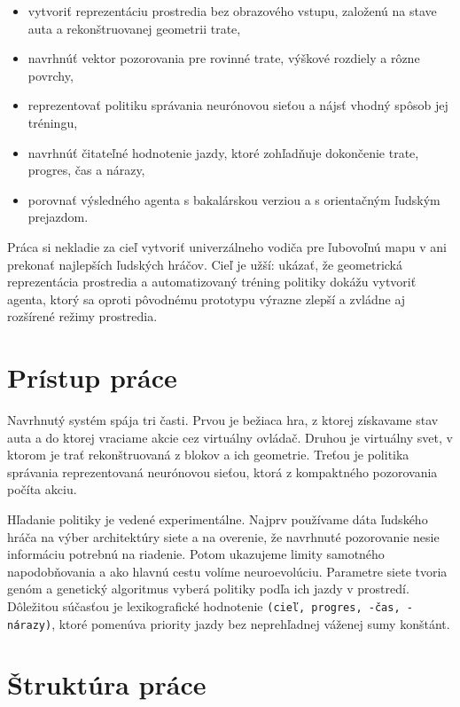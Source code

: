 \begin{itemize}
    \item vytvoriť reprezentáciu prostredia bez obrazového vstupu, založenú na stave auta a rekonštruovanej geometrii trate,
    \item navrhnúť vektor pozorovania pre rovinné trate, výškové rozdiely a rôzne povrchy,
    \item reprezentovať politiku správania neurónovou sieťou a nájsť vhodný spôsob jej tréningu,
    \item navrhnúť čitateľné hodnotenie jazdy, ktoré zohľadňuje dokončenie trate, progres, čas a nárazy,
    \item porovnať výsledného agenta s bakalárskou verziou a s orientačným ľudským prejazdom.
\end{itemize}

Práca si nekladie za cieľ vytvoriť univerzálneho vodiča pre ľubovoľnú mapu v \Trackmania{} ani prekonať najlepších ľudských hráčov. Cieľ je užší: ukázať, že geometrická reprezentácia prostredia a automatizovaný tréning politiky dokážu vytvoriť agenta, ktorý sa oproti pôvodnému prototypu výrazne zlepší a zvládne aj rozšírené režimy prostredia.

\section*{Prístup práce}

Navrhnutý systém spája tri časti. Prvou je bežiaca hra, z ktorej získavame stav auta a do ktorej vraciame akcie cez virtuálny ovládač. Druhou je virtuálny svet, v ktorom je trať rekonštruovaná z blokov a ich geometrie. Treťou je politika správania reprezentovaná neurónovou sieťou, ktorá z kompaktného pozorovania počíta akciu.

Hľadanie politiky je vedené experimentálne. Najprv používame dáta ľudského hráča na výber architektúry siete a na overenie, že navrhnuté pozorovanie nesie informáciu potrebnú na riadenie. Potom ukazujeme limity samotného napodobňovania a ako hlavnú cestu volíme neuroevolúciu. Parametre siete tvoria genóm a genetický algoritmus vyberá politiky podľa ich jazdy v prostredí. Dôležitou súčasťou je lexikografické hodnotenie \texttt{(cieľ, progres, -čas, -nárazy)}, ktoré pomenúva priority jazdy bez neprehľadnej váženej sumy konštánt.

\section*{Štruktúra práce}

